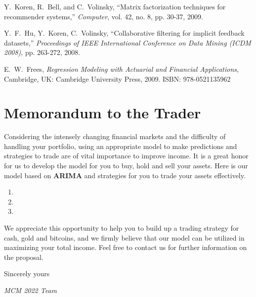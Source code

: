 \documentclass[12pt,a4paper]{article}
\newcommand{\Predictor}{ARIMA }
\begin{document}
\begin{spacing}{1.2}
\begin{thebibliography}{00}
Y.~Koren, R.~Bell, and C.~Volinsky, ``Matrix factorization techniques for recommender systems,'' \textit{Computer}, vol. 42, no. 8, pp. 30-37, 2009.

Y.~F.~Hu, Y.~Koren, C.~Volinsky, ``Collaborative filtering for implicit feedback datasets,'' \textit{Proceedings of IEEE International Conference on Data Mining (ICDM 2008)}, pp. 263-272, 2008.

E.~W.~Frees, \textit{Regression Modeling with Actuarial and Financial Applications}, Cambridge, UK: Cambridge University Press, 2009. ISBN: 978-0521135962

\end{thebibliography}


\addtocounter{page}{-1}
\thispagestyle{empty}

\newpage
\addtocounter{page}{-1}
\thispagestyle{empty}

{\centering\section*{Memorandum to the Trader}}

Considering the intensely changing financial markets and the difficulty of handling your portfolio, using an appropriate model to make predictions and strategies to trade are of vital importance to improve income. It is a great honor for us to develop the model for you to buy, hold and sell your assets. Here is our model based on \textbf{\Predictor} and strategies for you to trade your assets effectively.  

\begin{enumerate}
	\item 
	
	\item
	
	\item
\end{enumerate}

We appreciate this opportunity to help you to build up a trading strategy for cash, gold and bitcoins, and we firmly believe that our model can be utilized in maximizing your total income. Feel free to contact us for further information on the proposal.

Sincerely yours

\textit{MCM 2022 Team}



\end{spacing}
\end{document}

